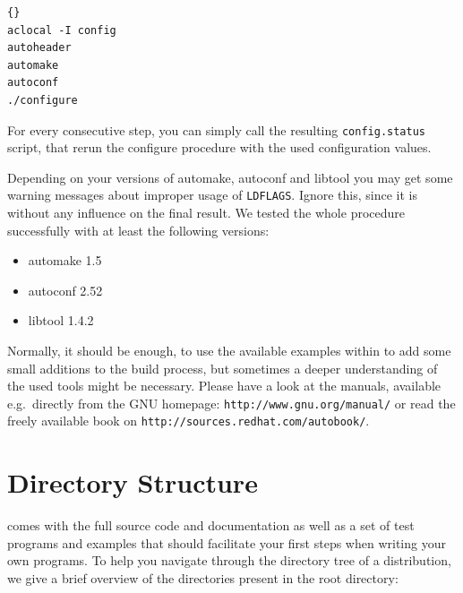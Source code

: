 \documentclass[10pt]{book}
\begin{document}
\begin{lstlisting}[frame=tb]{}
aclocal -I config
autoheader
automake
autoconf
./configure
\end{lstlisting}

For every consecutive step, you can simply call the resulting
\texttt{config.status} script, that rerun the configure procedure with
the used configuration values.

Depending on your versions of automake, autoconf and libtool you may
get some warning messages about improper usage of \texttt{LDFLAGS}.
Ignore this, since it is without any influence on the final result. We
tested the whole procedure successfully with at least the following
versions:
\begin{itemize}
\item automake 1.5
\item autoconf 2.52
\item libtool 1.4.2
\end{itemize}

Normally, it should be enough, to use the available examples within
\miro to add some small additions to the build process, but sometimes
a deeper understanding of the used tools might be necessary. Please
have a look at the manuals, available e.g.\ directly from the GNU
homepage: \texttt{http://www.gnu.org/manual/} or read the freely
available book on \texttt{http://sources.redhat.com/autobook/}.

\section{\miro Directory Structure}

\miro comes with the full source code and documentation as well as a
set of test programs and examples that should facilitate your first
steps when writing your own programs. To help you navigate through the
directory tree of a \miro distribution, we give a brief overview of
the directories present in the \miro root directory:
\end{document}
